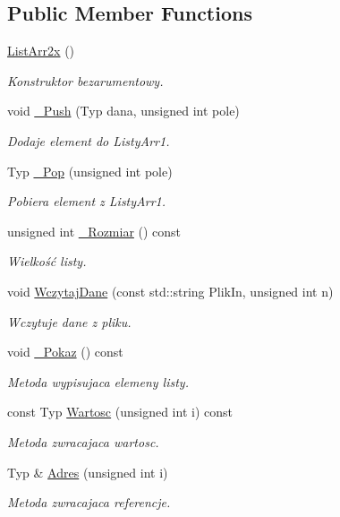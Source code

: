 \subsection*{Public Member Functions}
\begin{DoxyCompactItemize}
\item 
\hyperlink{class_list_arr2x_aa9169ef242cd69e31f4800213e403d53}{List\-Arr2x} ()
\begin{DoxyCompactList}\small\item\em Konstruktor bezarumentowy. \end{DoxyCompactList}\item 
void \hyperlink{class_list_arr2x_aac4d1cdaa29d7d3d0a85aa469281d784}{\-\_\-\-Push} (Typ dana, unsigned int pole)
\begin{DoxyCompactList}\small\item\em Dodaje element do Listy\-Arr1. \end{DoxyCompactList}\item 
Typ \hyperlink{class_list_arr2x_a4383548c83e707ba59d8d49ab051e8f8}{\-\_\-\-Pop} (unsigned int pole)
\begin{DoxyCompactList}\small\item\em Pobiera element z Listy\-Arr1. \end{DoxyCompactList}\item 
unsigned int \hyperlink{class_list_arr2x_aa9d38356df7fec58f282ec00148bd6db}{\-\_\-\-Rozmiar} () const 
\begin{DoxyCompactList}\small\item\em Wielkość listy. \end{DoxyCompactList}\item 
void \hyperlink{class_list_arr2x_a89de3396a3038ccd4ba2e632e194ae78}{Wczytaj\-Dane} (const std\-::string Plik\-In, unsigned int n)
\begin{DoxyCompactList}\small\item\em Wczytuje dane z pliku. \end{DoxyCompactList}\item 
void \hyperlink{class_list_arr2x_a1de6b30e511fef970573d06989bdbf30}{\-\_\-\-Pokaz} () const 
\begin{DoxyCompactList}\small\item\em Metoda wypisujaca elemeny listy. \end{DoxyCompactList}\item 
const Typ \hyperlink{class_list_arr2x_a1d441a5e86d979c8093543218faa13b3}{Wartosc} (unsigned int i) const 
\begin{DoxyCompactList}\small\item\em Metoda zwracajaca wartosc. \end{DoxyCompactList}\item 
Typ \& \hyperlink{class_list_arr2x_a18b7381c3fff0f489bd21dca90870f6f}{Adres} (unsigned int i)
\begin{DoxyCompactList}\small\item\em Metoda zwracajaca referencje. \end{DoxyCompactList}\end{DoxyCompactItemize}
